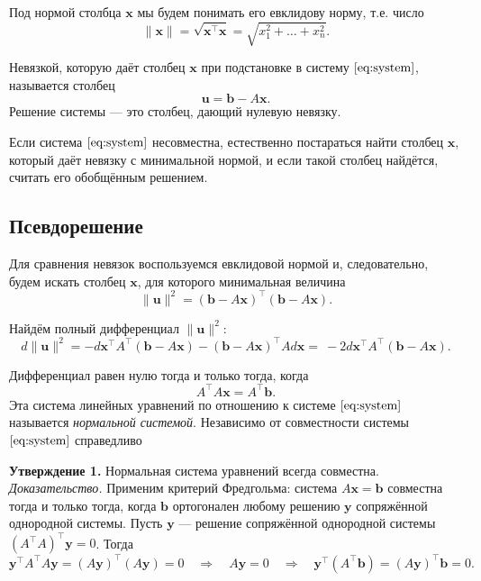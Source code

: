 \documentclass[11pt,a4paper]{article}
\begin{document}
Под нормой столбца \(\mathbf{x}\) мы будем понимать его евклидову норму,
т.е. число \[
  \|\mathbf{x}\| = \sqrt{\mathbf{x^\top x}} = \sqrt{x_1^2 + \ldots + x_n^2}.
\]

Невязкой, которую даёт столбец \(\mathbf{x}\) при подстановке в систему
\(\eqref{eq:system}\), называется столбец \[
  \mathbf{u} = \mathbf{b} - A\mathbf{x}.
\] Решение системы --- это столбец, дающий нулевую невязку.

Если система \(\eqref{eq:system}\) несовместна, естественно постараться
найти столбец \(\mathbf{x}\), который даёт невязку с минимальной нормой,
и если такой столбец найдётся, считать его обобщённым решением.

    \hypertarget{ux43fux441ux435ux432ux434ux43eux440ux435ux448ux435ux43dux438ux435}{%
\subsection{Псевдорешение}\label{ux43fux441ux435ux432ux434ux43eux440ux435ux448ux435ux43dux438ux435}}

Для сравнения невязок воспользуемся евклидовой нормой и, следовательно,
будем искать столбец \(\mathbf{x}\), для которого минимальная величина
\[
  \|\mathbf{u}\|^2 = (\mathbf{b} - A\mathbf{x})^\top (\mathbf{b} - A \mathbf{x}).
\]

Найдём полный дифференциал \(\|\mathbf{u}\|^2\): \[
  d\|\mathbf{u}\|^2 = -d\mathbf{x}^\top A^\top (\mathbf{b}-A\mathbf{x}) - (\mathbf{b}-A\mathbf{x})^\top A d\mathbf{x} = \
  -2d\mathbf{x}^\top A^\top (\mathbf{b} - A\mathbf{x}).
\]

Дифференциал равен нулю тогда и только тогда, когда
\[
  A^\top A \mathbf{x} = A^\top \mathbf{b}. \tag{2}\label{eq:norm_system}
\]
Эта система линейных уравнений по отношению к системе
\(\eqref{eq:system}\) называется \emph{нормальной системой}.
Независимо от совместности системы \(\eqref{eq:system}\) справедливо

\textbf{Утверждение 1.} Нормальная система уравнений всегда совместна.\\
\emph{Доказательство.} Применим критерий Фредгольма: система
\(A\mathbf{x}=\mathbf{b}\) совместна тогда и только тогда, когда
\(\mathbf{b}\) ортогонален любому решению \(\mathbf{y}\) сопряжённой
однородной системы. Пусть \(\mathbf{y}\) --- решение сопряжённой
однородной системы \((A^\top A)^\top \mathbf{y} = 0\). Тогда \[
  \mathbf{y}^\top A^\top A \mathbf{y} = (A \mathbf{y})^\top (A \mathbf{y}) = 0 \quad \Rightarrow \quad
  A \mathbf{y} = 0 \quad \Rightarrow \quad
  \mathbf{y}^\top (A^\top \mathbf{b}) = (A\mathbf{y})^\top \mathbf{b} = 0.
\]
\end{document}
